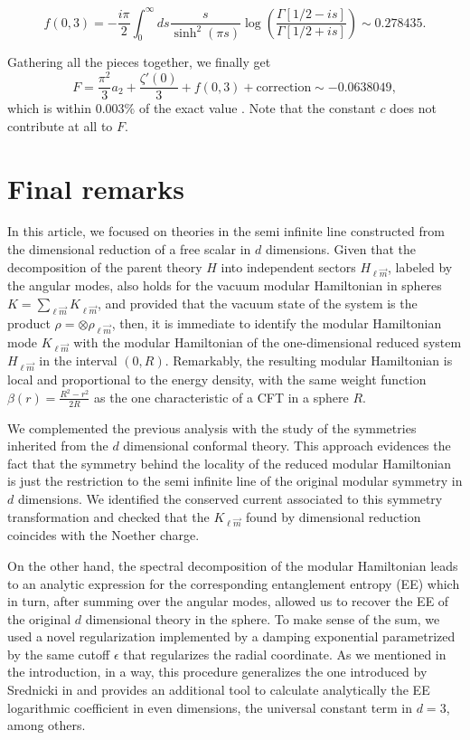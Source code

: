 \documentclass[12pt,a4paper]{article}
\begin{document}
\begin{equation}
f(0,3)=-\frac{i \pi}{2}\int_0^{\infty} ds \frac{s}{\sinh^2(\pi s)}\log{\left(\frac{\Gamma\left[1/2-i s\right]}{\Gamma\left[1/2+i s\right]}\right)}\sim 0.278435.
\end{equation}

Gathering all the pieces together, we finally get
\begin{equation}\label{F}
F= \frac{\pi^2}{3}a_2 +\frac{\zeta'(0)}{3} + f(0,3) + \text{correction}\sim -0.0638049,
\end{equation}
which is within $0.003 \%$ of the exact value \cite{Klebanov:2011gs,Casini:2015woa}. Note that the constant $c$ does not contribute at all to $F$.
\section{Final remarks}

In this article, we focused on theories in the semi infinite line constructed from the dimensional reduction of a free scalar in $d$ dimensions. Given that the decomposition of the parent theory $H$ into independent sectors $H_{\ell\vec{m}}$, labeled by the angular modes, also holds for the vacuum modular Hamiltonian in spheres $K=\sum_{\ell\vec{m}} K_{\ell\vec{m}}$, and provided that the vacuum state of the system is the product $\rho=\otimes\rho_{\ell\vec{m}}$, then, it is immediate to identify the modular Hamiltonian mode $K_{\ell\vec{m}}$ with the modular Hamiltonian of the one-dimensional reduced system $H_{\ell\vec{m}}$ in the interval $(0,R)$. Remarkably, the resulting modular Hamiltonian is local and proportional to the energy density, with the same weight function $\beta(r)=\frac{R^2-r^2}{2R}$ as the one characteristic of a CFT in a sphere $R$. 

We complemented the previous analysis with the study of the symmetries inherited from the $d$ dimensional conformal theory. This approach evidences the fact that the symmetry behind the locality of the reduced modular Hamiltonian is just the restriction to the semi infinite line of the original modular symmetry in $d$ dimensions.
We identified the conserved current associated to this symmetry transformation and checked that the $K_{\ell\vec{m}}$ found by dimensional reduction coincides with the Noether charge.

On the other hand, the spectral decomposition of the modular Hamiltonian leads to an analytic expression for the corresponding entanglement entropy (EE) which in turn, after summing over the angular modes, allowed us to recover the EE of the original $d$ dimensional theory in the sphere. 
To make sense of the sum, we used a novel regularization implemented by a damping exponential parametrized by the same cutoff $\epsilon$ that regularizes the radial coordinate. As we mentioned in the introduction, in a way, this procedure generalizes the one introduced by Srednicki in \cite{Srednicki:1993im} and provides an additional tool to calculate analytically the EE logarithmic coefficient in even dimensions, the universal constant term in $d=3$, among others.
\end{document}

